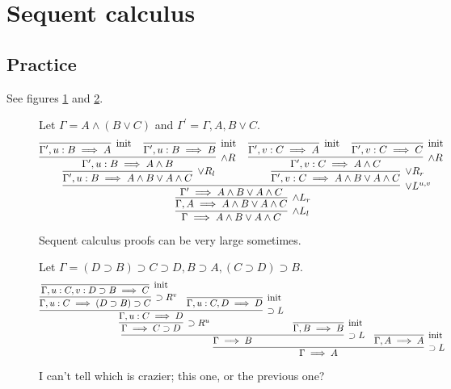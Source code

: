 \documentclass[11pt,letterpaper]{article}
\DeclareMathOperator{\opInit}{\mathrm{init}}
\newcommand{\init}{\opInit{}}
\newcommand{\seq}{\implies}
\newcommand{\imp}{\supset}
\begin{document}
\section{Sequent calculus}

\subsection{Practice}

See figures \ref{fig:seq-calc-1} and \ref{fig:seq-calc-2}.

\begin{figure}[ht]
    \centering
    Let $\Gamma = A \land (B \lor C)$ and $\Gamma^\prime = \Gamma, A, B \lor C$.
    \begin{equation*}
        \infer[\land L_l]{\Gamma \seq A \land B \lor A \land C}{
            \infer[\land L_r]{\Gamma, A \seq A \land B \lor A \land C}{
                \infer[\lor L^{u,v}]{\Gamma^\prime \seq A \land B \lor A \land C}{
                    \infer[\lor R_l]{\Gamma^\prime, u:B \seq A \land B \lor A \land C}{
                        \infer[\land R]{\Gamma^\prime, u:B \seq A \land B}{
                            \infer[\init]{\Gamma^\prime, u:B \seq A}{}
                            &
                            \infer[\init]{\Gamma^\prime, u:B \seq B}{}
                        }
                    }
                    &
                    \infer[\lor R_r]{\Gamma^\prime, v:C \seq A \land B \lor A \land C}{
                        \infer[\land R]{\Gamma^\prime, v:C \seq A \land C}{
                            \infer[\init]{\Gamma^\prime, v:C \seq A}{}
                            &
                            \infer[\init]{\Gamma^\prime, v:C \seq C}{}
                        }
                    }
                }
            }
        }
    \end{equation*}
    \caption{
        Sequent calculus proofs can be very large sometimes.
    }
    \label{fig:seq-calc-1}
\end{figure}

\begin{figure}[ht]
    \centering
    Let $\Gamma = (D \imp B) \imp C \imp D, B \imp A, (C \imp D) \imp B$.
    \begin{equation*}
        \infer[\imp L]{\Gamma \seq A}{
            \infer[\imp L]{\Gamma \seq B}{
                \infer[\imp R^u]{\Gamma \seq C \imp D}{
                    \infer[\imp L]{\Gamma, u:C \seq D}{
                        \infer[\imp R^v]{\Gamma, u:C \seq (D \imp B) \imp C}{
                            \infer[\init]{\Gamma, u:C, v:D \imp B \seq C}{}
                        }
                        &
                        \infer[\init]{\Gamma, u:C, D \seq D}{}
                    }
                }
                &
                \infer[\init]{\Gamma, B \seq B}{}
            }
            &
            \infer[\init]{\Gamma, A \seq A}{}
        }
    \end{equation*}
    \caption{
        I can't tell which is crazier; this one, or the previous one?
    }
    \label{fig:seq-calc-2}
\end{figure}
\end{document}
